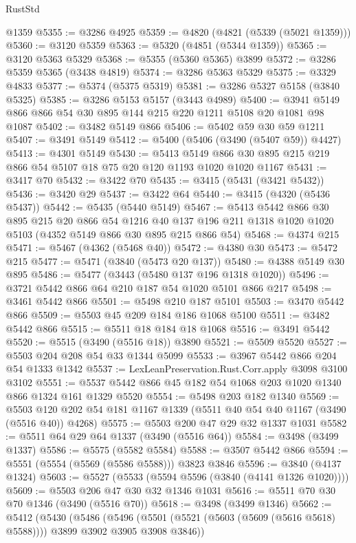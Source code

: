 \begin{lexlean}{RustStd}
\begin{coremodule}
    @1359
@5355 := @3286 @4925
@5359 := @4820 (@4821 (@5339 (@5021 @1359)))
@5360 := @3120 @5359
@5363 := @5320 (@4851 (@5344 @1359))
@5365 := @3120 @5363 @5329
@5368 := @5355 (@5360 @5365) @3899
@5372 := @3286 @5359 @5365 (@3438 @4819)
@5374 := @3286 @5363 @5329
@5375 := @3329 @4833
@5377 := @5374 (@5375 @5319)
@5381 := @3286 @5327 @5158 (@3840 @5325)
@5385 := @3286 @5153 @5157 (@3443 @4989)
@5400 := @3941 @5149 @866 @866 @54 @30 @895 @144 @215 @220 @1211 @5108 @20 @1081 @98 @1087
@5402 := @3482 @5149 @866
@5406 := @5402 @59 @30 @59 @1211
@5407 := @3491 @5149
@5412 := @5400 (@5406 (@3490 (@5407 @59)) @4427)
@5413 := @4301 @5149
@5430 := @5413 @5149 @866 @30 @895 @215 @219 @866 @54 @5107 @18 @75 @20 @120 @1193 @1020 @1020 @1167
@5431 := @3417 @70
@5432 := @3422 @70
@5435 := @3415 (@5431 (@3421 @5432))
@5436 := @3420 @29
@5437 := @3422 @64
@5440 := @3415 (@4320 (@5436 @5437))
@5442 := @5435 (@5440 @5149)
@5467 := @5413
    @5442
    @866
    @30
    @895
    @215
    @20
    @866
    @54
    @1216
    @40
    @137
    @196
    @211
    @1318
    @1020
    @1020
    @5103
    (@4352 @5149 @866 @30 @895 @215 @866 @54)
@5468 := @4374 @215
@5471 := @5467 (@4362 (@5468 @40))
@5472 := @4380 @30
@5473 := @5472 @215
@5477 := @5471 (@3840 (@5473 @20 @137))
@5480 := @4388 @5149 @30 @895
@5486 := @5477 (@3443 (@5480 @137 @196 @1318 @1020))
@5496 := @3721 @5442 @866 @64 @210 @187 @54 @1020 @5101 @866 @217
@5498 := @3461 @5442 @866
@5501 := @5498 @210 @187 @5101
@5503 := @3470 @5442 @866
@5509 := @5503 @45 @209 @184 @186 @1068 @5100
@5511 := @3482 @5442 @866
@5515 := @5511 @18 @184 @18 @1068
@5516 := @3491 @5442
@5520 := @5515 (@3490 (@5516 @18)) @3890
@5521 := @5509 @5520
@5527 := @5503 @204 @208 @54 @33 @1344 @5099
@5533 := @3967 @5442 @866 @204 @54 @1333 @1342
@5537 := LexLeanPreservation.Rust.Corr.apply @3098 @3100 @3102
@5551 := @5537 @5442 @866 @45 @182 @54 @1068 @203 @1020 @1340 @866 @1324 @161 @1329 @5520
@5554 := @5498 @203 @182 @1340
@5569 := @5503 @120 @202 @54 @181 @1167 @1339 (@5511 @40 @54 @40 @1167 (@3490 (@5516 @40)) @4268)
@5575 := @5503 @200 @47 @29 @32 @1337 @1031
@5582 := @5511 @64 @29 @64 @1337 (@3490 (@5516 @64))
@5584 := @3498 (@3499 @1337)
@5586 := @5575 (@5582 @5584)
@5588 := @3507 @5442 @866
@5594 := @5551 (@5554 (@5569 (@5586 @5588))) @3823 @3846
@5596 := @3840 (@4137 @1324)
@5603 := @5527 (@5533 (@5594 @5596 (@3840 (@4141 @1326 @1020))))
@5609 := @5503 @206 @47 @30 @32 @1346 @1031
@5616 := @5511 @70 @30 @70 @1346 (@3490 (@5516 @70))
@5618 := @3498 (@3499 @1346)
@5662 := @5412
    (@5430
      (@5486
        (@5496 (@5501 (@5521 (@5603 (@5609 (@5616 @5618) @5588)))) @3899 @3902 @3905 @3908 @3846))

\end{coremodule}
\end{lexlean}
